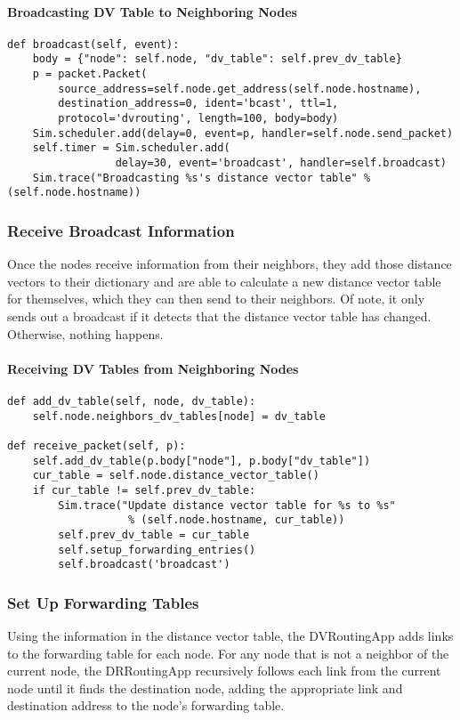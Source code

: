 \documentclass[11pt]{article}
\begin{document}
\paragraph{Broadcasting DV Table to Neighboring Nodes} \hspace{2mm}
\begin{lstlisting}
def broadcast(self, event):
    body = {"node": self.node, "dv_table": self.prev_dv_table}
    p = packet.Packet(
        source_address=self.node.get_address(self.node.hostname),
        destination_address=0, ident='bcast', ttl=1, 
        protocol='dvrouting', length=100, body=body)
    Sim.scheduler.add(delay=0, event=p, handler=self.node.send_packet)
    self.timer = Sim.scheduler.add(
                 delay=30, event='broadcast', handler=self.broadcast)
    Sim.trace("Broadcasting %s's distance vector table" % (self.node.hostname))
\end{lstlisting}

\subsubsection{Receive Broadcast Information}
Once the nodes receive information from their neighbors, they add those distance vectors to their dictionary and are able to calculate a new distance vector table for themselves, which they can then send to their neighbors. Of note, it only sends out a broadcast if it detects that the distance vector table has changed. Otherwise, nothing happens.

\paragraph{Receiving DV Tables from Neighboring Nodes} \hspace{2mm}
\begin{lstlisting}
def add_dv_table(self, node, dv_table):
    self.node.neighbors_dv_tables[node] = dv_table

def receive_packet(self, p):
    self.add_dv_table(p.body["node"], p.body["dv_table"])
    cur_table = self.node.distance_vector_table()
    if cur_table != self.prev_dv_table:
        Sim.trace("Update distance vector table for %s to %s" 
                   % (self.node.hostname, cur_table))
        self.prev_dv_table = cur_table
        self.setup_forwarding_entries()
        self.broadcast('broadcast')
\end{lstlisting}

\subsubsection{Set Up Forwarding Tables}
Using the information in the distance vector table, the DVRoutingApp adds links to the forwarding table for each node. For any node that is not a neighbor of the current node, the DRRoutingApp recursively follows each link from the current node until it finds the destination node, adding the appropriate link and destination address to the node's forwarding table.
\end{document}
